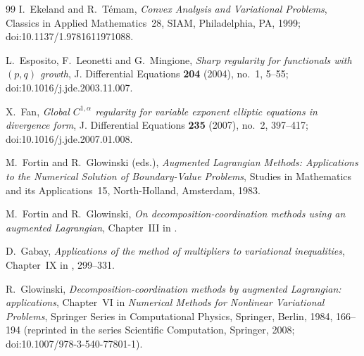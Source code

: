 \documentclass[11pt]{amsart}
\theoremstyle{definition}
\theoremstyle{remark}
\numberwithin{equation}{section}
\begin{document}
\begin{thebibliography}{99}
I.~Ekeland and R.~T\'emam, \emph{Convex Analysis and Variational Problems}, Classics in Applied Mathematics~28, SIAM, Philadelphia, PA, 1999; doi:10.1137/1.9781611971088.

L.~Esposito, F.~Leonetti and G.~Mingione, \emph{Sharp regularity for functionals with $(p,q)$ growth}, J. Differential Equations \textbf{204} (2004), no.~1, 5--55; doi:10.1016/j.jde.2003.11.007.

X.~Fan, \emph{Global $C^{1,\alpha}$ regularity for variable exponent elliptic equations in divergence form}, J. Differential Equations \textbf{235} (2007), no.~2, 397--417; doi:10.1016/j.jde.2007.01.008.

M.~Fortin and R.~Glowinski (eds.), \emph{Augmented Lagrangian Methods: Applications to the Numerical Solution of Boundary-Value Problems}, Studies in Mathematics and its Applications~15, North-Holland, Amsterdam, 1983.

M.~Fortin and R.~Glowinski, \emph{On decomposition-coordination methods using an augmented Lagrangian}, Chapter~III in \cite{FortinGlowinski1983}.

D.~Gabay, \emph{Applications of the method of multipliers to variational inequalities}, Chapter~IX in \cite{FortinGlowinski1983}, 299--331.

R.~Glowinski, \emph{Decomposition-coordination methods by augmented Lagrangian: applications}, Chapter~VI in \emph{Numerical Methods for Nonlinear Variational Problems}, Springer Series in Computational Physics, Springer, Berlin, 1984, 166--194 (reprinted in the series Scientific Computation, Springer, 2008; doi:10.1007/978-3-540-77801-1).


\end{thebibliography}
\end{document}
